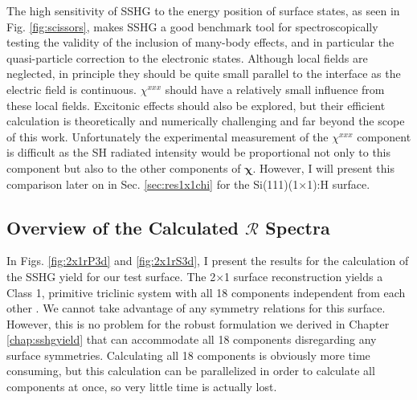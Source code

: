 The high sensitivity of SSHG to the energy position of surface states, as seen
in Fig. \ref{fig:scissors}, makes SSHG a good benchmark tool for
spectroscopically testing the validity of the inclusion of many-body effects,
and in particular the quasi-particle correction to the electronic states.
Although local fields are neglected, in principle they should be quite small
parallel to the interface as the electric field is continuous. $\chi^{xxx}$
should have a relatively small influence from these local fields. Excitonic
effects should also be explored, but their efficient calculation is
theoretically and numerically challenging \cite{beyond} and far beyond the scope
of this work. Unfortunately the experimental measurement of the $\chi^{xxx}$
component is difficult as the SH radiated intensity would be proportional not
only to this component but also to the other components of $\boldsymbol{\chi}$.
However, I will present this comparison later on in Sec. \ref{sec:res1x1chi} for
the Si(111)(1$\times$1):H surface.



\subsection{Overview of the Calculated \texorpdfstring{$\mathcal{R}$}{R}
Spectra}\label{sec:2x1R3D}

In Figs. \ref{fig:2x1rP3d} and \ref{fig:2x1rS3d}, I present the results for the
calculation of the SSHG yield for our test surface. The 2$\times$1 surface
reconstruction yields a Class 1, primitive triclinic system with all 18
components independent from each other \cite{popovbook}. We cannot take
advantage of any symmetry relations for this surface. However, this is no
problem for the robust formulation we derived in Chapter \ref{chap:sshgyield}
that can accommodate all 18 components disregarding any surface symmetries.
Calculating all 18 components is obviously more time consuming, but this
calculation can be parallelized in order to calculate all components at once, so
very little time is actually lost.

